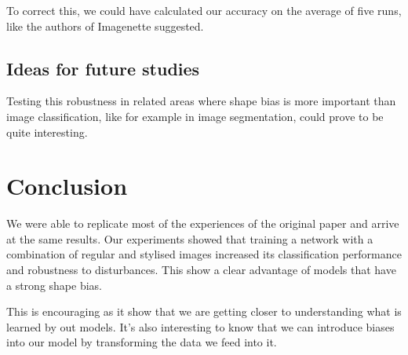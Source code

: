 \documentclass{article}
\begin{document}
\noindent
To correct this, we could have calculated our accuracy on the average of five runs, like the authors of Imagenette \cite{fastai2019}
suggested.

\subsection{Ideas for future studies}

Testing this robustness in related areas where shape bias is more important than image classification, like for example in image segmentation, could prove to be quite interesting.

\section{Conclusion}

We were able to replicate most of the experiences of the original paper and arrive at the same results.
Our experiments showed that training a network with a combination of regular and stylised images increased its classification performance and robustness to disturbances.
This show a clear advantage of models that have a strong shape bias.

This is encouraging as it show that we are getting closer to understanding what is learned by out models. It's also interesting to know that we can introduce biases into our model by transforming the data we feed into it.


\newpage
\appendix



\end{document}
